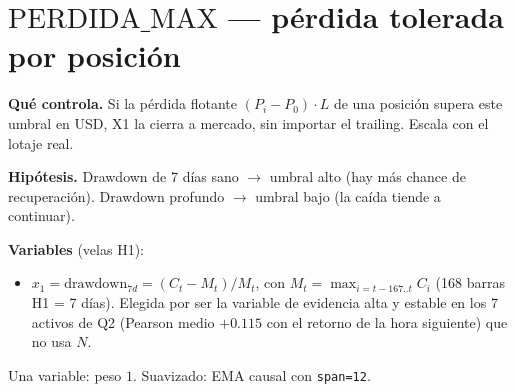 \documentclass[11pt,a4paper]{article}
\newcommand{\code}[1]{\texttt{\small #1}}
\begin{document}
\section*{$\text{PERDIDA\_MAX}$ --- pérdida tolerada por posición}

\textbf{Qué controla.} Si la pérdida flotante $(P_i-P_0)\cdot L$ de una posición supera este umbral en USD, X1 la cierra a mercado, sin importar el trailing. Escala con el lotaje real.

\textbf{Hipótesis.} Drawdown de 7 días sano $\rightarrow$ umbral alto (hay más chance de recuperación). Drawdown profundo $\rightarrow$ umbral bajo (la caída tiende a continuar).

\textbf{Variables} (velas H1):
\begin{itemize}\setlength{\itemsep}{1pt}\setlength{\topsep}{1pt}
\item $x_1=\text{drawdown}_{7d}=(C_t-M_t)/M_t$, con $M_t=\max_{i=t-167..t}C_i$ (168 barras H1 = 7 días). Elegida por ser la variable de evidencia alta y estable en los 7 activos de Q2 (Pearson medio $+0.115$ con el retorno de la hora siguiente) que no usa $N$.
\end{itemize}
Una variable: peso $1$. Suavizado: EMA causal con \code{span=12}.
\end{document}
